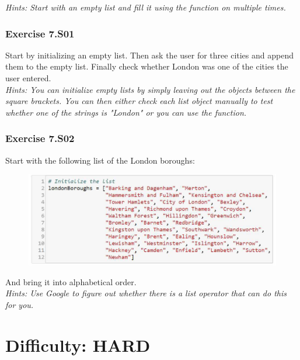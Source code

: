 \textit{Hints:
Start with an empty list {} and fill it using the {} function on {} multiple times.}\\[1cm]




\subsubsection*{Exercise 7.S01}
Start by initializing an empty list. Then ask the user for three cities and append them to the
empty list. Finally check whether London was one of the cities the user entered.\\


\textit{Hints:
You can initialize empty lists by simply leaving out the objects between the square brackets.
You can then either check each list object manually to test whether one of the strings is
"London" or you can use the {} function.}\\[1cm]




\subsubsection*{Exercise 7.S02}
Start with the following list of the London boroughs:
\begin{figure}[H]
		\centering
		\includegraphics[width=\textwidth]{../IMG/7S02.png} 
\end{figure}
And bring it into alphabetical order.\\


\textit{Hints:
Use Google to figure out whether there is a list operator that can do this for you.}



\newpage
\section{Difficulty: HARD}

